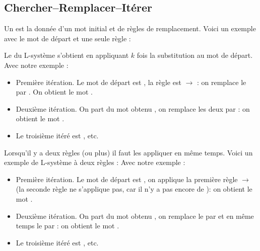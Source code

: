 \documentclass[11pt,class=report,crop=false]{standalone}
\begin{document}
\subsection{Chercher--Remplacer--Itérer}


Un  est la donnée d'un mot initial et de règles de remplacement.
Voici un exemple avec le mot de départ et une seule règle : 


Le  du L-système s'obtient en appliquant $k$ fois la substitution au mot de départ.
Avec notre exemple :
\begin{itemize}
  \item Première itération. Le mot de départ est , la règle est  $\rightarrow$  : on remplace le  par . On obtient le mot .
  
  \item Deuxième itération. On part du mot obtenu , on remplace les deux  par  : on obtient le mot .
  
  \item Le troisième itéré est , etc.  
\end{itemize}

Lorsqu'il y a deux règles (ou plus) il faut les appliquer en même temps.
Voici un exemple de L-système à deux règles :
Avec notre exemple :
\begin{itemize}
  \item Première itération. Le mot de départ est , on applique la première règle  $\rightarrow$  (la seconde règle ne s'applique pas, car il n'y a pas encore de ): on obtient le mot .
  
  \item Deuxième itération. On part du mot obtenu , on remplace le  par  et en même temps le  par  : on obtient le mot .
  
  \item Le troisième itéré est , etc.  
\end{itemize}
\end{document}
